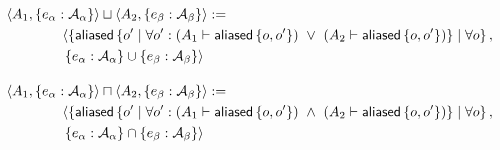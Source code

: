 %
\begin{align*}
&
\context{A_1}{\set{ e_\alpha : \A_\alpha }} \contextunion
\context{A_2}{\set{ e_\beta : \A_\beta }} :=
\\ & \hspace{4em}
\langle
  \set{
    \aliased\set{
      o\p
      \mid
      \forall o\p :
      (A_1 \entails \aliased\set{o, o\p}) \ \lor \
      (A_2 \entails \aliased\set{o, o\p}) }
    \mid
    \forall o
  },
\\ & \hspace{4em}
  \set{ e_\alpha : \A_\alpha } \cup \set{ e_\beta : \A_\beta }
\rangle
%
\\[1em]
%
&
\context{A_1}{\set{ e_\alpha : \A_\alpha }} \contextintersection
\context{A_2}{\set{ e_\beta : \A_\beta }} :=
\\ & \hspace{4em}
\langle
  \set{
    \aliased\set{
      o\p
      \mid
      \forall o\p :
      (A_1 \entails \aliased\set{o, o\p}) \ \land \
      (A_2 \entails \aliased\set{o, o\p}) }
    \mid
    \forall o
  },
\\ & \hspace{4em}
  \set{ e_\alpha : \A_\alpha } \cap \set{ e_\beta : \A_\beta }
\rangle
\end{align*}

%
